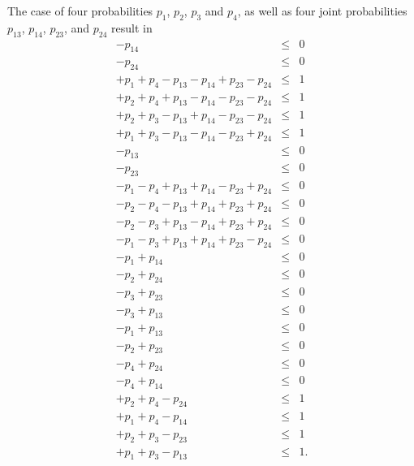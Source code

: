 \documentclass[%
  twocolumn,
 showpacs,
 showkeys,
 preprintnumbers,
 amsmath,amssymb,
 aps,
  pra,
  longbibliography,
 floatfix,
 ]{revtex4-1}
\begin{document}
The case of four probabilities
$p_1$, $p_2$, $p_3$  and $p_4$,
as well as four joint probabilities $p_{13}$, $p_{14}$, $p_{23}$, and $p_{24}$
result in
\begin{eqnarray}
                                          -p_{14}                        &\le&  0\\
                                                            -p_{24}      &\le&  0\\
 +p_{1}                  +p_{4}  -p_{13}  -p_{14}  +p_{23}  -p_{24}      &\le&  1\\
         +p_{2}          +p_{4}  +p_{13}  -p_{14}  -p_{23}  -p_{24}      &\le&  1\\
         +p_{2}  +p_{3}          -p_{13}  +p_{14}  -p_{23}  -p_{24}      &\le&  1\\
 +p_{1}          +p_{3}          -p_{13}  -p_{14}  -p_{23}  +p_{24}      &\le&  1\\
                                 -p_{13}                                 &\le&  0\\
                                                   -p_{23}               &\le&  0\\
 -p_{1}                  -p_{4}  +p_{13}  +p_{14}  -p_{23}  +p_{24}      &\le&  0\\
         -p_{2}          -p_{4}  -p_{13}  +p_{14}  +p_{23}  +p_{24}      &\le&  0\\
         -p_{2}  -p_{3}          +p_{13}  -p_{14}  +p_{23}  +p_{24}      &\le&  0\\
 -p_{1}          -p_{3}          +p_{13}  +p_{14}  +p_{23}  -p_{24}      &\le&  0\\
 -p_{1}                                   +p_{14}                        &\le&  0\\
         -p_{2}                                             +p_{24}      &\le&  0\\
                 -p_{3}                            +p_{23}               &\le&  0\\
                 -p_{3}          +p_{13}                                 &\le&  0\\
 -p_{1}                          +p_{13}                                 &\le&  0\\
         -p_{2}                                    +p_{23}               &\le&  0\\
                         -p_{4}                             +p_{24}      &\le&  0\\
                         -p_{4}           +p_{14}                        &\le&  0\\
         +p_{2}          +p_{4}                             -p_{24}      &\le&  1\\
 +p_{1}                  +p_{4}           -p_{14}                        &\le&  1\\
         +p_{2}  +p_{3}                            -p_{23}               &\le&  1\\
 +p_{1}          +p_{3}          -p_{13}                                 &\le&  1
.
\label{2017-b-2-2-p-c}
\end{eqnarray}
\end{document}
